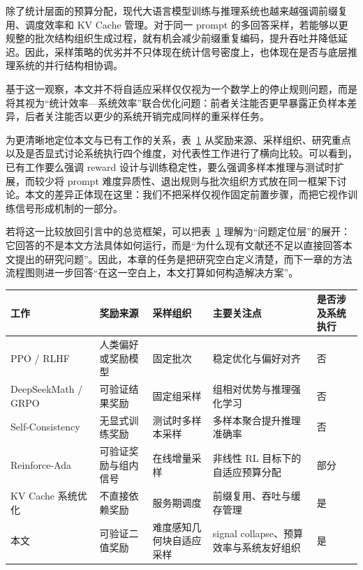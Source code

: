 除了统计层面的预算分配，现代大语言模型训练与推理系统也越来越强调前缀复用、调度效率和 KV Cache 管理\citep{xu2026kvcacheoptimizationstrategies,jaillet2025online,dong2025accelerating}。对于同一 prompt 的多回答采样，若能够以更规整的批次结构组织生成过程，就有机会减少前缀重复编码，提升吞吐并降低延迟。因此，采样策略的优劣并不只体现在统计信号密度上，也体现在是否与底层推理系统的并行结构相协调。

基于这一观察，本文并不将自适应采样仅仅视为一个数学上的停止规则问题，而是将其视为“统计效率—系统效率”联合优化问题：前者关注能否更早暴露正负样本差异，后者关注能否以更少的系统开销完成同样的重采样任务。

为更清晰地定位本文与已有工作的关系，表~\ref{tab:related_compare} 从奖励来源、采样组织、研究重点以及是否显式讨论系统执行四个维度，对代表性工作进行了横向比较。可以看到，已有工作要么强调 reward 设计与训练稳定性，要么强调多样本推理与测试时扩展，而较少将 prompt 难度异质性、退出规则与批次组织方式放在同一框架下讨论。本文的差异正体现在这里：我们不把采样仅视作固定前置步骤，而把它视作训练信号形成机制的一部分。

若将这一比较放回引言中的总览框架，可以把表~\ref{tab:related_compare} 理解为“问题定位层”的展开：它回答的不是本文方法具体如何运行，而是“为什么现有文献还不足以直接回答本文提出的研究问题”。因此，本章的任务是把研究空白定义清楚，而下一章的方法流程图则进一步回答“在这一空白上，本文打算如何构造解决方案”。

\begin{table}[!htbp]
    \label{tab:related_compare}
    \centering
    \footnotesize
    \setlength{\tabcolsep}{4pt}
    \begin{tabular}{>{\raggedright\arraybackslash}p{2.3cm}>{\raggedright\arraybackslash}p{2.0cm}>{\raggedright\arraybackslash}p{2.1cm}>{\raggedright\arraybackslash}p{3.0cm}>{\raggedright\arraybackslash}p{1.3cm}}
        \hline
        工作 & 奖励来源 & 采样组织 & 主要关注点 & 是否涉及系统执行 \\
        \hline
        PPO / RLHF\citep{schulman2017proximal,ouyang2022training} & 人类偏好或奖励模型 & 固定批次 & 稳定优化与偏好对齐 & 否 \\
        DeepSeekMath / GRPO\citep{deepseekai2025deepseekr1} & 可验证结果奖励 & 固定组采样 & 组相对优势与推理强化学习 & 否 \\
        Self-Consistency\citep{wang2022selfconsistency} & 无显式训练奖励 & 测试时多样本采样 & 多样本聚合提升推理准确率 & 否 \\
        Reinforce-Ada\citep{xiong2025reinforceada} & 可验证奖励与组内信号 & 在线增量采样 & 非线性 RL 目标下的自适应预算分配 & 部分 \\
        KV Cache 系统优化\citep{jaillet2025online,dong2025accelerating,xu2026kvcacheoptimizationstrategies} & 不直接依赖奖励 & 服务期调度 & 前缀复用、吞吐与缓存管理 & 是 \\
        本文 & 可验证二值奖励 & 难度感知几何块自适应采样 & signal collapse、预算效率与系统友好组织 & 是 \\
        \hline
    \end{tabular}
\end{table}


